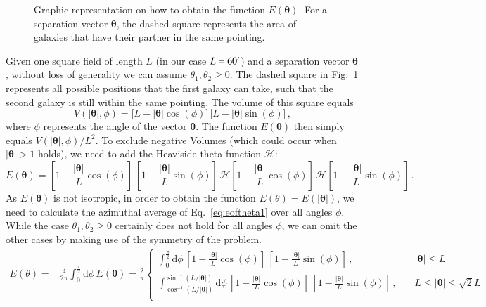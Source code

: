 \documentclass[referee]{aa} %
\renewcommand{\[}{\begin{equation}}
\renewcommand{\]}{\end{equation}}
\renewcommand{\rm}{\mathrm}
\def\inv{^{-1}}
\def\b#1{\bm{#1}}
\def\d{\rm{d}}
\begin{document}
\begin{appendix}
{
\def\vec{\b}
\begin{figure}
    \centering
    \def\svgwidth{200pt}    
    \hspace*{1cm}
      
    \hspace*{-2cm}
    \caption[Graphic how to obtain $E(\b\theta)$]{Graphic representation on how to obtain the function $E(\b\theta)$. For a separation vector $\b\theta$, the dashed square represents the area of galaxies that have their partner in the same pointing.}
    \label{fig:explain_etheta}
\end{figure}
}
Given one square field of length $L$ (in our case $L=60^\prime$) and a separation vector $\b\theta$, without loss of generality we can assume $\theta_1,\theta_2\geq 0$. The dashed square in Fig.~\ref{fig:explain_etheta} represents all possible positions that the first galaxy can take, such that the second galaxy is still within the same pointing. The volume of this square equals \begin{equation}
V(|\b\theta|,\phi)  = \big[L-|\b\theta|\cos(\phi)\big]\,\big[L-|\b\theta|\sin(\phi)\big]\, ,
\end{equation} where $\phi$ represents the angle of the vector $\b\theta$. The function $E(\b\theta)$ then simply equals $V(|\b\theta|,\phi)/L^2$. To exclude negative Volumes (which could occur when $|\b\theta|>1$ holds), we need to add the Heaviside theta function $\mathcal{H}$:
\begin{equation}
E(\b\theta)  = \left[1-\frac{|\b\theta|}{L}\cos(\phi)\right]\,\left[1-\frac{|\b\theta|}{L}\sin(\phi)\right]\, \mathcal{H}\left[1-\frac{|\b\theta|}{L}\cos(\phi)\right]\,\mathcal{H}\left[1-\frac{|\b\theta|}{L}\sin(\phi)\right]\, .
\label{eq:eoftheta1}
\end{equation} 
As $E(\b\theta)$ is not isotropic, in order to obtain the function $E(\theta) = E(|\b\theta|)$, we need to calculate the azimuthal average of Eq.~\eqref{eq:eoftheta1} over all angles $\phi$. While the case $\theta_1,\theta_2\geq 0$ certainly does not hold for all angles $\phi$, we can omit the other cases by making use of the symmetry of the problem.
\begin{align}
E(\theta) = & \frac{4}{2\pi}\int_0^{\frac{\pi}{2}}\d\phi\, E(\b\theta) = \frac{2}{\pi}\begin{cases}
\int_0^{\frac{\pi}{2}} \d\phi\, \left[1-\frac{|\b\theta|}{L}\cos(\phi)\right]\,\left[1-\frac{|\b\theta|}{L}\sin(\phi)\right]\, ,  & |\b\theta|  \leq L \\[10pt]
\int_{\cos\inv(L/|\b\theta|)}^{\sin\inv(L/|\b\theta|)} \d\phi\, \left[1-\frac{|\b\theta|}{L}\cos(\phi)\right]\,\left[1-\frac{|\b\theta|}{L}\sin(\phi)\right] \, , \quad   & L \leq |\b\theta| \leq \sqrt{2}L \\[10pt]

\end{cases}
\end{align}
\end{appendix}
\end{document}
